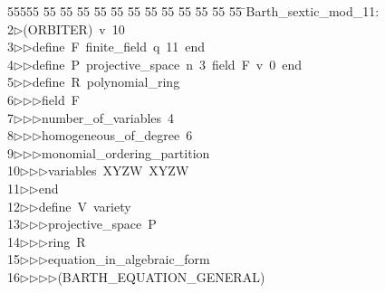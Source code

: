 %
%
\begin{tabbing}
55555 \= 55 \= 55 \= 55 \= 55 \= 55 \= 55 \= 55 \= 55 \= 55 \= 55 \= 55 \= 55 \= \>Barth\_sextic\_mod\_11:\\[0pt]
2\>$\triangleright$\>(ORBITER)\ v\ 10\ \\[0pt]
3\>$\triangleright$\>$\triangleright$\>define\ F\ finite\_field\ q\ 11\ end\ \\[0pt]
4\>$\triangleright$\>$\triangleright$\>define\ P\ projective\_space\ n\ 3\ field\ F\ v\ 0\ end\ \\[0pt]
5\>$\triangleright$\>$\triangleright$\>define\ R\ polynomial\_ring\ \\[0pt]
6\>$\triangleright$\>$\triangleright$\>$\triangleright$\>field\ F\ \\[0pt]
7\>$\triangleright$\>$\triangleright$\>$\triangleright$\>number\_of\_variables\ 4\ \\[0pt]
8\>$\triangleright$\>$\triangleright$\>$\triangleright$\>homogeneous\_of\_degree\ 6\ \\[0pt]
9\>$\triangleright$\>$\triangleright$\>$\triangleright$\>monomial\_ordering\_partition\ \\[0pt]
10\>$\triangleright$\>$\triangleright$\>$\triangleright$\>variables\ XYZW\ XYZW\ \\[0pt]
11\>$\triangleright$\>$\triangleright$\>end\ \\[0pt]
12\>$\triangleright$\>$\triangleright$\>define\ V\ variety\ \\[0pt]
13\>$\triangleright$\>$\triangleright$\>$\triangleright$\>projective\_space\ P\ \\[0pt]
14\>$\triangleright$\>$\triangleright$\>$\triangleright$\>ring\ R\ \\[0pt]
15\>$\triangleright$\>$\triangleright$\>$\triangleright$\>equation\_in\_algebraic\_form\ \\[0pt]
16\>$\triangleright$\>$\triangleright$\>$\triangleright$\>$\triangleright$\>(BARTH\_EQUATION\_GENERAL)\ \\[0pt]

\end{tabbing}
